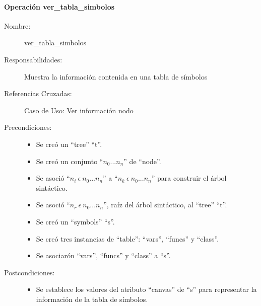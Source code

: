 \paragraph{Operación ver\_tabla\_simbolos}
\FloatBarrier
\begin{framed}
	\begin{description}
		\item [Nombre:] ver\_tabla\_simbolos
		\item [Responsabilidades:] Muestra la información contenida en una tabla de símbolos
		\item [Referencias Cruzadas: ] Caso de Uso: Ver información nodo
      \item [Precondiciones:] \hfill
         \begin {itemize}
         \item Se creó un ``tree'' ``t''.
         \item Se creó un conjunto ``$n_0...n_n$'' de ``node''.
         \item Se asoció ``$n_i\ \epsilon\ n_0...n_n$'' a ``$n_k\ \epsilon\ n_0...n_n$'' para construir el árbol sintáctico.
         \item Se asoció  ``$n_r\ \epsilon\ n_0...n_n$'', raíz del árbol sintáctico, al ``tree'' ``t''.
         \item Se creó un ``symbols'' ``s''.
         \item Se creó tres instancias de ``table'': ``vars'', ``funcs'' y ``class''.
         \item Se asociarón ``vars'', ``funcs'' y ``class'' a ``s''.
      \end{itemize}
      \item [Postcondiciones:] \hfill
      \begin {itemize}
         \item Se establece los valores del atributo ``canvas'' de ``s'' para representar la información de la tabla de símbolos.
      \end{itemize}
	\end{description} 
\end{framed}
\FloatBarrier



